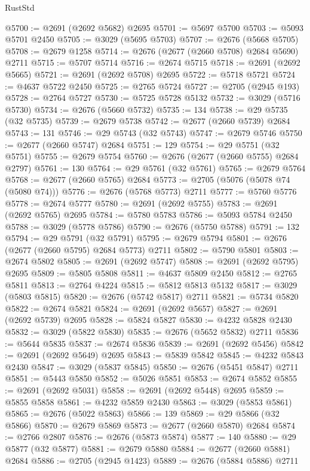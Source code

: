 \begin{lexlean}{RustStd}
\begin{coremodule}
@5700 := @2691 (@2692 @5682) @2695
@5701 := @5697 @5700
@5703 := @5093 @5701 @2450
@5705 := @3029 (@5695 @5703)
@5707 := @2676 (@5668 @5705)
@5708 := @2679 @1258
@5714 := @2676 (@2677 (@2660 @5708) @2684 @5690) @2711
@5715 := @5707 @5714
@5716 := @2674 @5715
@5718 := @2691 (@2692 @5665)
@5721 := @2691 (@2692 @5708) @2695
@5722 := @5718 @5721
@5724 := @4637 @5722 @2450
@5725 := @2765 @5724
@5727 := @2705 (@2945 @193)
@5728 := @2764 @5727
@5730 := @5725 @5728 @5132
@5732 := @3029 (@5716 @5730)
@5734 := @2676 (@5660 @5732)
@5735 := 134
@5738 := @29 @5735 (@32 @5735)
@5739 := @2679 @5738
@5742 := @2677 (@2660 @5739) @2684
@5743 := 131
@5746 := @29 @5743 (@32 @5743)
@5747 := @2679 @5746
@5750 := @2677 (@2660 @5747) @2684
@5751 := 129
@5754 := @29 @5751 (@32 @5751)
@5755 := @2679 @5754
@5760 := @2676 (@2677 (@2660 @5755) @2684 @2797)
@5761 := 130
@5764 := @29 @5761 (@32 @5761)
@5765 := @2679 @5764
@5768 := @2677 (@2660 @5765) @2684
@5773 := @2705 (@5076 (@5078 @74 (@5080 @74)))
@5776 := @2676 (@5768 @5773) @2711
@5777 := @5760 @5776
@5778 := @2674 @5777
@5780 := @2691 (@2692 @5755)
@5783 := @2691 (@2692 @5765) @2695
@5784 := @5780 @5783
@5786 := @5093 @5784 @2450
@5788 := @3029 (@5778 @5786)
@5790 := @2676 (@5750 @5788)
@5791 := 132
@5794 := @29 @5791 (@32 @5791)
@5795 := @2679 @5794
@5801 := @2676 (@2677 (@2660 @5795) @2684 @5773) @2711
@5802 := @5790 @5801
@5803 := @2674 @5802
@5805 := @2691 (@2692 @5747)
@5808 := @2691 (@2692 @5795) @2695
@5809 := @5805 @5808
@5811 := @4637 @5809 @2450
@5812 := @2765 @5811
@5813 := @2764 @4224
@5815 := @5812 @5813 @5132
@5817 := @3029 (@5803 @5815)
@5820 := @2676 (@5742 @5817) @2711
@5821 := @5734 @5820
@5822 := @2674 @5821
@5824 := @2691 (@2692 @5657)
@5827 := @2691 (@2692 @5739) @2695
@5828 := @5824 @5827
@5830 := @4232 @5828 @2430
@5832 := @3029 (@5822 @5830)
@5835 := @2676 (@5652 @5832) @2711
@5836 := @5644 @5835
@5837 := @2674 @5836
@5839 := @2691 (@2692 @5456)
@5842 := @2691 (@2692 @5649) @2695
@5843 := @5839 @5842
@5845 := @4232 @5843 @2430
@5847 := @3029 (@5837 @5845)
@5850 := @2676 (@5451 @5847) @2711
@5851 := @5443 @5850
@5852 := @5026 @5851
@5853 := @2674 @5852
@5855 := @2691 (@2692 @5031)
@5858 := @2691 (@2692 @5448) @2695
@5859 := @5855 @5858
@5861 := @4232 @5859 @2430
@5863 := @3029 (@5853 @5861)
@5865 := @2676 (@5022 @5863)
@5866 := 139
@5869 := @29 @5866 (@32 @5866)
@5870 := @2679 @5869
@5873 := @2677 (@2660 @5870) @2684
@5874 := @2766 @2807
@5876 := @2676 (@5873 @5874)
@5877 := 140
@5880 := @29 @5877 (@32 @5877)
@5881 := @2679 @5880
@5884 := @2677 (@2660 @5881) @2684
@5886 := @2705 (@2945 @1423)
@5889 := @2676 (@5884 @5886) @2711

\end{coremodule}
\end{lexlean}
